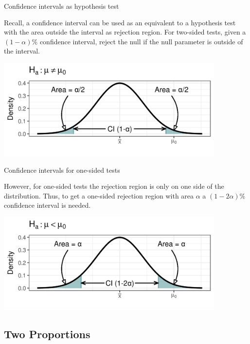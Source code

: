 \documentclass[xcolor=table, handout]{beamer}
\begin{document}
\begin{frame}{Confidence intervals as hypothesis test}
\begin{block}{}
\large
Recall, a confidence interval can be used as an equivalent to a hypothesis test with the area outside the interval as rejection region. For two-sided tests, given a $(1-\alpha)$\% confidence interval, reject the null if the null parameter is outside of the interval.  
\end{block}
\medskip
{\centering
\includegraphics[width=4.5in]{../images/ch09_two_ci}
\par}
\end{frame}

\begin{frame}{Confidence intervals for one-sided tests}
\begin{block}{}
\large
However, for one-sided tests the rejection region is only on one side of the distribution. Thus, to get a one-sided rejection region with area $\alpha$ a $(1-2\alpha)$\% confidence interval is needed.
\end{block}
\medskip
{\centering
\includegraphics[width=4.5in]{../images/ch09_one_ci}
\par}
\end{frame}


\subsection{Two Proportions}
\end{document}
